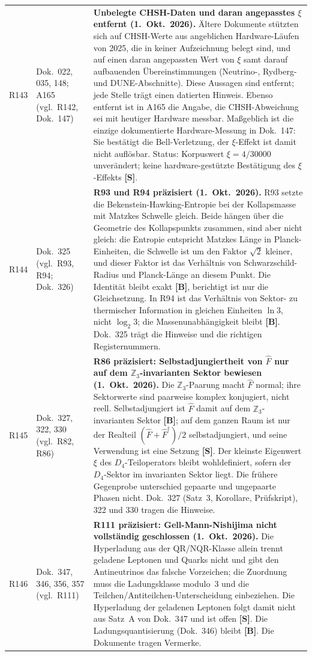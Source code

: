 \begin{longtable}{@{}p{0.9cm}p{3.1cm}p{10.2cm}@{}}
R143 & Dok.~022, 035, 148; A165 (vgl.\ R142, Dok.~147) & \textbf{Unbelegte CHSH-Daten und daran angepasstes $\xi$ entfernt (1.~Okt.~2026).} Ältere Dokumente stützten sich auf CHSH-Werte aus angeblichen Hardware-Läufen von 2025, die in keiner Aufzeichnung belegt sind, und auf einen daran angepassten Wert von $\xi$ samt darauf aufbauenden Übereinstimmungen (Neutrino-, Rydberg- und DUNE-Abschnitte). Diese Aussagen sind entfernt; jede Stelle trägt einen datierten Hinweis. Ebenso entfernt ist in A165 die Angabe, die CHSH-Abweichung sei mit heutiger Hardware messbar. Maßgeblich ist die einzige dokumentierte Hardware-Messung in Dok.~147: Sie bestätigt die Bell-Verletzung, der $\xi$-Effekt ist damit nicht auflösbar. Status: Korpuswert $\xi = 4/30000$ unverändert; keine hardware-gestützte Bestätigung des $\xi$-Effekts \textbf{[S]}. \\
R144 & Dok.~325 (vgl.\ R93, R94; Dok.~326) & \textbf{R93 und R94 präzisiert (1.~Okt.~2026).} R93 setzte die Bekenstein-Hawking-Entropie bei der Kollapsmasse mit Matzkes Schwelle gleich. Beide hängen über die Geometrie des Kollapspunkts zusammen, sind aber nicht gleich: die Entropie entspricht Matzkes Länge in Planck-Einheiten, die Schwelle ist um den Faktor $\sqrt{2}$ kleiner, und dieser Faktor ist das Verhältnis von Schwarzschild-Radius und Planck-Länge an diesem Punkt. Die Identität bleibt exakt \textbf{[B]}, berichtigt ist nur die Gleichsetzung. In R94 ist das Verhältnis von Sektor- zu thermischer Information in gleichen Einheiten $\ln 3$, nicht $\log_2 3$; die Massenunabhängigkeit bleibt \textbf{[B]}. Dok.~325 trägt die Hinweise und die richtigen Registernummern. \\
R145 & Dok.~327, 322, 330 (vgl.\ R82, R86) & \textbf{R86 präzisiert: Selbstadjungiertheit von $\hat{F}$ nur auf dem $\mathbb{Z}_3$-invarianten Sektor bewiesen (1.~Okt.~2026).} Die $\mathbb{Z}_3$-Paarung macht $\hat{F}$ normal; ihre Sektorwerte sind paarweise komplex konjugiert, nicht reell. Selbstadjungiert ist $\hat{F}$ damit auf dem $\mathbb{Z}_3$-invarianten Sektor \textbf{[B]}; auf dem ganzen Raum ist nur der Realteil $(\hat{F}+\hat{F}^\dagger)/2$ selbstadjungiert, und seine Verwendung ist eine Setzung \textbf{[S]}. Der kleinste Eigenwert $\xi$ des $D_4$-Teiloperators bleibt wohldefiniert, sofern der $D_4$-Sektor im invarianten Sektor liegt. Die frühere Gegenprobe unterschied gepaarte und ungepaarte Phasen nicht. Dok.~327 (Satz~3, Korollare, Prüfskript), 322 und 330 tragen die Hinweise. \\
R146 & Dok.~347, 346, 356, 357 (vgl.\ R111) & \textbf{R111 präzisiert: Gell-Mann-Nishijima nicht vollständig geschlossen (1.~Okt.~2026).} Die Hyperladung aus der QR/NQR-Klasse allein trennt geladene Leptonen und Quarks nicht und gibt den Antineutrinos das falsche Vorzeichen; die Zuordnung muss die Ladungsklasse modulo~3 und die Teilchen/Antiteilchen-Unterscheidung einbeziehen. Die Hyperladung der geladenen Leptonen folgt damit nicht aus Satz~A von Dok.~347 und ist offen \textbf{[S]}. Die Ladungsquantisierung (Dok.~346) bleibt \textbf{[B]}. Die Dokumente tragen Vermerke. \\

\end{longtable}
